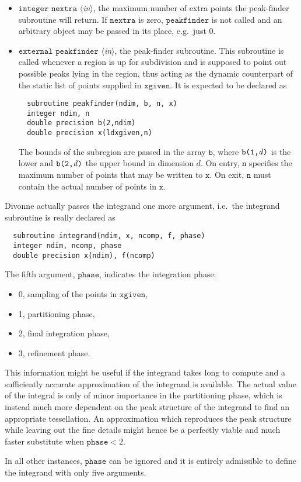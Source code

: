 \documentclass[12pt]{article}
\newcommand\ie{i.e.\ }
\newcommand\eg{e.g.\ }
\newcommand\Code[1]{\ensuremath{\texttt{#1}}}
\newcommand\Var[1]{\ensuremath{\mathit{#1}}}
\newcommand\VarIn[1]{\item\Code{#1} \textit{$\langle$in\/$\rangle$},}
\begin{document}
\begin{itemize}
\VarIn{integer nextra}
the maximum number of extra points the peak-finder subroutine will
return.  If \Code{nextra} is zero, \Code{peakfinder} is not called
and an arbitrary object may be passed in its place, \eg just 0.

\VarIn{external peakfinder}
the peak-finder subroutine.  This subroutine is called whenever a region 
is up for subdivision and is supposed to point out possible peaks lying 
in the region, thus acting as the dynamic counterpart of the static list 
of points supplied in \Code{xgiven}.  It is expected to be declared as
\begin{verbatim}
  subroutine peakfinder(ndim, b, n, x)
  integer ndim, n
  double precision b(2,ndim)
  double precision x(ldxgiven,n)
\end{verbatim}
The bounds of the subregion are passed in the array \Code{b}, where 
\Code{b(1,\Var{d})} is the lower and \Code{b(2,\Var{d})} the upper 
bound in dimension \Var{d}.  On entry, \Code{n} specifies the maximum 
number of points that may be written to \Code{x}.  On exit, \Code{n} 
must contain the actual number of points in \Code{x}.
\end{itemize}
Divonne actually passes the integrand one more argument, \ie the 
integrand subroutine is really declared as
\begin{verbatim}
  subroutine integrand(ndim, x, ncomp, f, phase)
  integer ndim, ncomp, phase
  double precision x(ndim), f(ncomp)
\end{verbatim}
The fifth argument, \Code{phase}, indicates the integration phase:
\begin{itemize}
\item 0, sampling of the points in \Code{xgiven},
\item 1, partitioning phase,
\item 2, final integration phase,
\item 3, refinement phase.
\end{itemize}
This information might be useful if the integrand takes long to compute
and a sufficiently accurate approximation of the integrand is available. 
The actual value of the integral is only of minor importance in the
partitioning phase, which is instead much more dependent on the peak
structure of the integrand to find an appropriate tessellation.  An
approximation which reproduces the peak structure while leaving out the
fine details might hence be a perfectly viable and much faster
substitute when $\Code{phase} < 2$.

In all other instances, \Code{phase} can be ignored and it is
entirely admissible to define the integrand with only five arguments.
\end{document}
